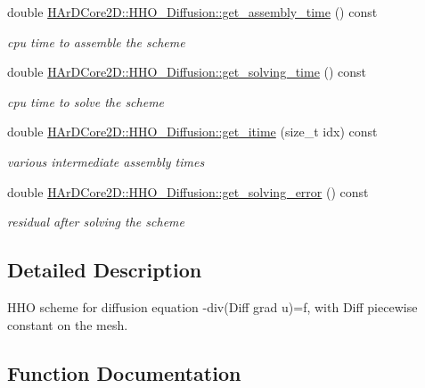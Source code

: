 \begin{DoxyCompactItemize}
double \hyperlink{group__HHO__Diffusion_ga4b67f061d06b1aea5a626792a2bddd1e}{H\+Ar\+D\+Core2\+D\+::\+H\+H\+O\+\_\+\+Diffusion\+::get\+\_\+assembly\+\_\+time} () const
\begin{DoxyCompactList}\small\item\em cpu time to assemble the scheme \end{DoxyCompactList}\item 
\mbox{\label{group__HHO__Diffusion_ga0ba01c42bc116f962b6982b27e95b471}} 
double \hyperlink{group__HHO__Diffusion_ga0ba01c42bc116f962b6982b27e95b471}{H\+Ar\+D\+Core2\+D\+::\+H\+H\+O\+\_\+\+Diffusion\+::get\+\_\+solving\+\_\+time} () const
\begin{DoxyCompactList}\small\item\em cpu time to solve the scheme \end{DoxyCompactList}\item 
\mbox{\label{group__HHO__Diffusion_ga43051dfce03a9f75c33903f1736f4e1a}} 
double \hyperlink{group__HHO__Diffusion_ga43051dfce03a9f75c33903f1736f4e1a}{H\+Ar\+D\+Core2\+D\+::\+H\+H\+O\+\_\+\+Diffusion\+::get\+\_\+itime} (size\+\_\+t idx) const
\begin{DoxyCompactList}\small\item\em various intermediate assembly times \end{DoxyCompactList}\item 
\mbox{\label{group__HHO__Diffusion_gad53ffa4a52af7bf6803e28f36c7e3365}} 
double \hyperlink{group__HHO__Diffusion_gad53ffa4a52af7bf6803e28f36c7e3365}{H\+Ar\+D\+Core2\+D\+::\+H\+H\+O\+\_\+\+Diffusion\+::get\+\_\+solving\+\_\+error} () const
\begin{DoxyCompactList}\small\item\em residual after solving the scheme \end{DoxyCompactList}\end{DoxyCompactItemize}


\subsection{Detailed Description}
H\+HO scheme for diffusion equation -\/div(Diff grad u)=f, with Diff piecewise constant on the mesh. 



\subsection{Function Documentation}
\mbox{\label{group__HHO__Diffusion_ga9ab2e2cdf0c77f60069f7572c587c4f1}} 
